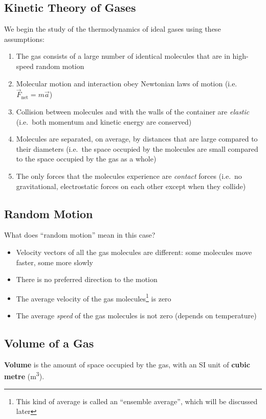 \subsection{Kinetic Theory of Gases}
We begin the study of the thermodynamics of ideal gases using these assumptions:
\begin{enumerate}
\item The gas consists of a large number of identical molecules that are in
  high-speed random motion
\item Molecular motion and interaction obey Newtonian laws of motion (i.e.\
  $\vec F_\text{net}=m\vec a$)
\item Collision between molecules and with the walls of the container are
  \emph{elastic} (i.e.\ both momentum and kinetic energy are conserved)
\item Molecules are separated, on average, by distances that are large
  compared to their diameters (i.e.\ the space occupied by the molecules are
  small compared to the space occupied by the gas as a whole)
\item The only forces that the molecules experience are \emph{contact} forces
  (i.e.\ no gravitational, electrostatic forces on each other except when
  they collide)
\end{enumerate}
%
%
%
%
\subsection{Random Motion}
What does ``random motion'' mean in this case?
\begin{itemize}
\item Velocity vectors of all the gas molecules are different: some molecules
  move faster, some more slowly
\item There is no preferred direction to the motion
\item The average velocity of the gas molecules\footnote{This kind of average
is called an ``ensemble average'', which will be discussed later} is zero
\item The average \emph{speed} of the gas molecules is not zero (depends on
  temperature)
\end{itemize}


\subsection{Volume of a Gas}
\textbf{Volume} is the amount of space occupied by the gas, with an SI unit of
\textbf{cubic metre} (\si{\metre\cubed}).
%
%
%
%
